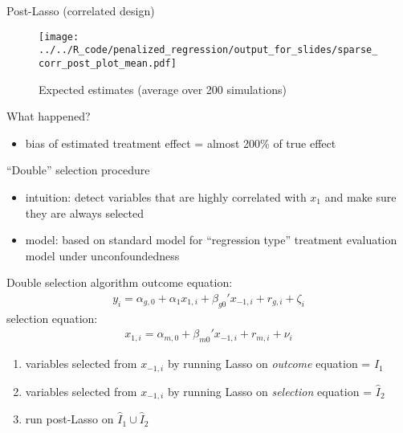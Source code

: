 \documentclass[xcolor=dvipsnames, handout]{beamer}
\begin{document}
\begin{frame}{Post-Lasso (correlated design)}
\begin{figure}
  \texttt{[image: ../../R\_code/penalized\_regression/output\_for\_slides/sparse\_corr\_post\_plot\_mean.pdf]}
   \caption{Expected estimates (average over 200 simulations)}
\end{figure}
\end{frame}

\begin{frame}{What happened?}
\begin{itemize}
  \item bias of estimated treatment effect = almost 200\% of true effect
\end{itemize}
\end{frame}

\begin{frame}{``Double'' selection procedure \parencite{belloni2014inference}}
\begin{itemize}
  \item intuition: detect variables that are highly correlated with $x_1$ and make sure they are always selected
  \item model: based on standard model for ``regression type'' treatment evaluation model under unconfoundedness
\end{itemize}
\end{frame}

\begin{frame}{Double selection algorithm}
outcome equation:
\begin{align*}
  y_i = \alpha_{g, 0} + \alpha_1 x_{1,i} + \beta_{g0}' x_{-1, i} + r_{g, i} + \zeta_i
\end{align*}
selection equation: 
\begin{align*}
  x_{1, i} = \alpha_{m, 0} + \beta_{m0}' x_{-1, i} + r_{m, i} + \nu_i
\end{align*}
\begin{enumerate}
  \item variables selected from $x_{-1, i}$ by running Lasso on \emph{outcome} equation = $\hat{I}_1$
  \item variables selected from $x_{-1, i}$ by running Lasso on \emph{selection} equation = $\hat{I}_2$
  \item run post-Lasso on $\hat{I}_1 \cup \hat{I}_2$
\end{enumerate}
\end{frame}
\end{document}
